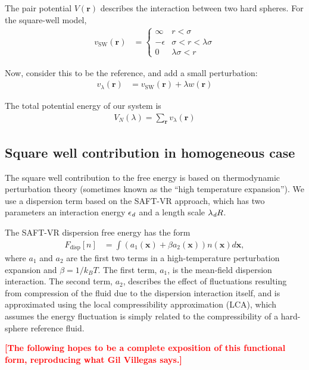 \documentclass[letterpaper,twocolumn,amsmath,amssymb,pre,aps,10pt]{revtex4-1}
\newcommand\xx{\mathbf{x}}
\newcommand\rr{\mathbf{r}}
\newcommand\fixme[1]{\textcolor{red}{\textbf{[#1]}}}
\begin{document}
The pair potential $V(\rr)$ describes the interaction between two hard spheres. For the square-well model,
\begin{align}
  v_\text{SW}(\rr) &=
    \begin{cases}
      \infty & r < \sigma \\
      -\epsilon & \sigma < r < \lambda\sigma \\
      0 & \lambda\sigma < r
    \end{cases}
\end{align}

Now, consider this to be the reference, and add a small perturbation:
\begin{align}
  v_\lambda(\rr) &= v_\text{SW}(\rr) + \lambda w(\rr)
\end{align}

The total potential energy of our system is
\begin{align}
  V_N(\lambda) = \sum_\rr v_\lambda(\rr)
\end{align}



\subsection{Square well contribution in homogeneous case}
The square well contribution to the free energy is based on
thermodynamic perturbation theory (sometimes known as the ``high
temperature expansion'').  We use a dispersion term based on the
SAFT-VR approach\cite{gil-villegas-1997-SAFT-VR}, which has two
parameters an interaction energy $\epsilon_\textit{d}$ and a length scale
$\lambda_\textit{d} R$.

The SAFT-VR dispersion free energy has the form~\cite{gil-villegas-1997-SAFT-VR}
\begin{align}
  F_\text{disp}[n] &= \int \left(a_1(\xx) + \beta a_2(\xx)\right)n(\xx)d\xx,
\end{align}
where $a_1$ and $a_2$ are the first two terms in a high-temperature
perturbation expansion and $\beta=1/k_BT$.  The first term, $a_1$, is
the mean-field dispersion interaction. The second term, $a_2$, describes the
effect of fluctuations resulting from compression of the fluid due
to the dispersion interaction itself, and is approximated
using the local compressibility approximation (LCA), which
assumes the energy fluctuation is simply related to the
compressibility of a hard-sphere reference fluid\cite{barker1976liquid}.

\fixme{The following hopes to be a complete exposition of this functional form,
  reproducing what Gil Villegas says.}
\end{document}
